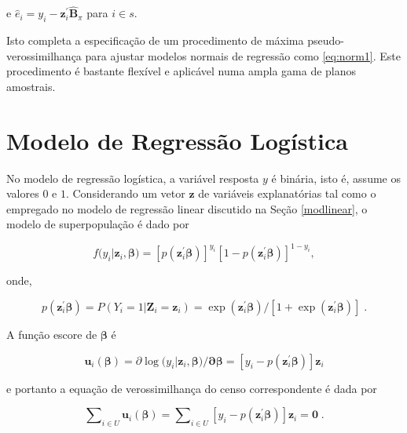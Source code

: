\documentclass[]{book}
\numberwithin{example}{chapter}
\numberwithin{remark}{chapter}
\numberwithin{definition}{chapter}
\begin{document}
e
\(\hat{e}_{i}=y_{i}-\mathbf{z}_{i}^{\prime }\widehat{\mathbf{B}}_{\pi }\)
para \(i\in s\).

Isto completa a especificação de um procedimento de máxima
pseudo-verossimilhança para ajustar modelos normais de regressão como
\eqref{eq:norm1}. Este procedimento é bastante flexível e aplicável numa
ampla gama de planos amostrais.

\section{Modelo de Regressão Logística}\label{modlogist}

No modelo de regressão logística, a variável resposta \(y\) é binária,
isto é, assume os valores \(0\) e \(1\). Considerando um vetor
\(\mathbf{z}\) de variáveis explanatórias tal como o empregado no modelo
de regressão linear discutido na Seção \ref{modlinear}, o modelo de
superpopulação é dado por

\begin{equation}
f(y_{i}|\mathbf{z}_{i},\mathbf{\beta )=}\left[ p\left( \mathbf{z}_{i}^{\prime }\mathbf{\beta }\right) \right] ^{y_{i}}\left[ 1-p\left( 
\mathbf{z}_{i}^{\prime }\mathbf{\beta }\right) \right] ^{1-y_{i}},
\label{eq:norm25}
\end{equation}

onde,

\[
p\left( \mathbf{z}_{i}^{\prime }\mathbf{\beta }\right) =P\left( \left.
Y_{i}=1\right| \mathbf{Z}_{i}=\mathbf{z}_{i}\right) =\exp \left( \mathbf{z}_{i}^{\prime }\mathbf{\beta }\right) /\left[ 1+\exp \left( \mathbf{z}
_{i}^{\prime }\mathbf{\beta }\right) \right] \;. 
\]

A função escore de \(\mathbf{\beta }\) é

\begin{equation}
\mathbf{u}_{i}\left( \mathbf{\beta }\right) =\partial \log (y_{i}|\mathbf{z}_{i},\mathbf{\beta )/\partial \beta =}\left[ y_{i}-p\left( \mathbf{z}
_{i}^{\prime }\mathbf{\beta }\right) \right] \mathbf{z}_{i}  \label{eq:norm25a}
\end{equation}

e portanto a equação de verossimilhança do censo correspondente é dada
por

\begin{equation}
\sum\nolimits_{i\in U}\mathbf{u}_{i}\left( \mathbf{\beta }\right)
=\sum\nolimits_{i\in U}\left[ y_{i}-p\left( \mathbf{z}_{i}^{\prime }\mathbf{
\beta }\right) \right] \mathbf{z}_{i}=\mathbf{0\;.}  \label{eq:norm26}
\end{equation}
\end{document}
